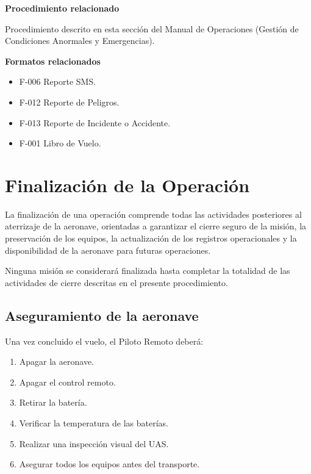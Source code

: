 \begin{tcolorbox}[title=Documentos asociados,colback=gray!5,colframe=black]

\textbf{Procedimiento relacionado}

Procedimiento descrito en esta sección del Manual de Operaciones (Gestión de Condiciones Anormales y Emergencias).

\vspace{0.3cm}

\textbf{Formatos relacionados}

\begin{itemize}

\item F-006 Reporte SMS.

\item F-012 Reporte de Peligros.

\item F-013 Reporte de Incidente o Accidente.

\item F-001 Libro de Vuelo.

\end{itemize}

\end{tcolorbox}


\section{Finalización de la Operación}

La finalización de una operación comprende todas las actividades posteriores al aterrizaje de la aeronave, orientadas a garantizar el cierre seguro de la misión, la preservación de los equipos, la actualización de los registros operacionales y la disponibilidad de la aeronave para futuras operaciones.

Ninguna misión se considerará finalizada hasta completar la totalidad de las actividades de cierre descritas en el presente procedimiento.

\subsection{Aseguramiento de la aeronave}

Una vez concluido el vuelo, el Piloto Remoto deberá:

\begin{enumerate}

\item Apagar la aeronave.

\item Apagar el control remoto.

\item Retirar la batería.

\item Verificar la temperatura de las baterías.

\item Realizar una inspección visual del UAS.

\item Asegurar todos los equipos antes del transporte.

\end{enumerate}



